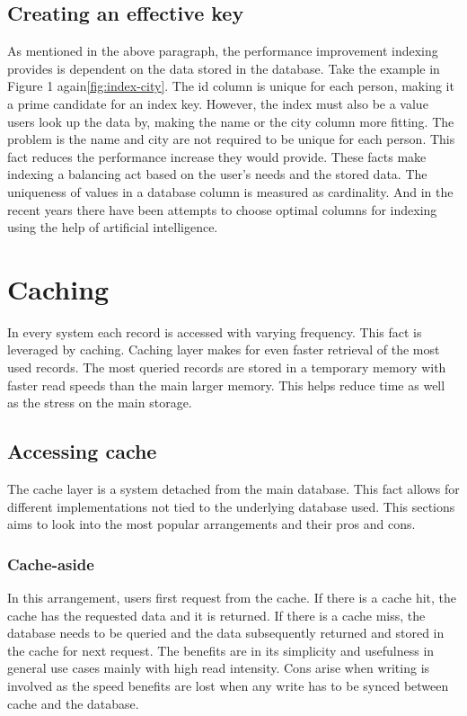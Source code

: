 \documentclass[10pt,twoside,a4paper]{article}
\begin{document}
\subsection{Creating an effective key}
As mentioned in the above paragraph, the performance improvement indexing provides is dependent on the data stored in the database.
Take the example in Figure 1 again\ref{fig:index-city}. The id column is unique for each person, making it a prime candidate for an index key. However, the index must also be a value users look up the data by, making the name or the city column more fitting. The problem is the name and city are not required to be unique for each person. This fact reduces the performance increase they would provide. These facts make indexing a balancing act based on the user's needs and the stored data. The uniqueness of values in a database column is measured as cardinality. And in the recent years there have been attempts to choose optimal columns for indexing using the help of artificial intelligence.\cite{li2023stone}

\section{Caching}
In every system each record is accessed with varying frequency. This fact is leveraged by caching. Caching layer makes for even faster retrieval of the most used records. The most queried records are stored in a temporary memory with faster read speeds than the main larger memory. This helps reduce time as well as the stress on the main storage. \cite{10.1145/3009837.3009891}

\subsection{Accessing cache}
The cache layer is a system detached from the main database. This fact allows for different implementations not tied to the underlying database used. This sections aims to look into the most popular arrangements and their pros and cons.\cite{AWS}\cite{Prisma}

\subsubsection{Cache-aside}
\label{sec:cache-aside}
In this arrangement, users first request from the cache. If there is a cache hit, the cache has the requested data and it is returned. If there is a cache miss, the database needs to be queried and the data subsequently returned and stored in the cache for next request. The benefits are in its simplicity and usefulness in general use cases mainly with high read intensity. 
Cons arise when writing is involved as the speed benefits are lost when any write has to be synced between cache and the database.
\end{document}
